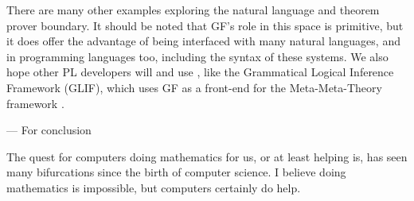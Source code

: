 There are many other examples exploring the natural language and theorem prover
boundary. It should be noted that GF's role in this space is primitive, but it
does offer the advantage of being interfaced with many natural languages, and in
programming languages too, including the syntax of these systems. We also hope
other PL developers will and use , like the Grammatical Logical Inference
Framework (GLIF), which uses GF as a front-end for the Meta-Meta-Theory
framework \cite{schaefer2020glif}.





--- For conclusion



The quest for computers doing mathematics for us, or at least helping is, has
seen many bifurcations since the birth of computer science. I believe doing
mathematics is impossible, but computers certainly do help.